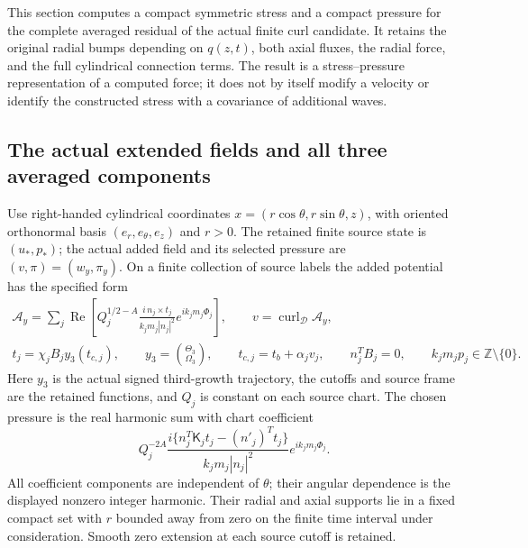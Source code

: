 This section computes a compact symmetric stress and a compact pressure
for the complete averaged residual of the actual finite curl candidate.
It retains the original radial bumps depending on $q(z,t)$, both axial
fluxes, the radial force, and the full cylindrical connection terms.
The result is a stress--pressure representation of a computed force;
it does not by itself modify a velocity or identify the constructed
stress with a covariance of additional waves.

\subsection{The actual extended fields and all three averaged components}

Use right-handed cylindrical coordinates
$x=(r\cos\theta,r\sin\theta,z)$, with oriented orthonormal basis
$(e_r,e_\theta,e_z)$ and $r>0$. The retained finite source state is
$(u_*,p_*)$; the actual added field and its selected pressure are
$(v,\pi)=(w_y,\pi_y)$. On a finite collection of source labels the
added potential has the specified form
\begin{equation}\label{mcstress:actual_potential}
\begin{gathered}
 \mathcal A_y=\sum_j\operatorname{Re}
   \left[Q_j^{1/2-A}
     \frac{i\,n_j\times t_j}{k_jm_j|n_j|^2}
                      e^{ik_jm_j\Phi_j}\right],\qquad
 v=\operatorname{curl}_{\mathscr D}\mathcal A_y,\\
 t_j=\chi_jB_jy_3(t_{c,j}),\qquad
 y_3=\binom{\Theta_3}{\Omega_3},\qquad
 t_{c,j}=t_b+\alpha_jv_j,\qquad
 n_j^TB_j=0,\qquad k_jm_jp_j\in\mathbb Z\setminus\{0\}.
\end{gathered}
\end{equation}
Here $y_3$ is the actual signed third-growth trajectory, the cutoffs
and source frame are the retained functions, and $Q_j$ is constant
on each source chart. The chosen pressure is the real harmonic sum
with chart coefficient
\[
 Q_j^{-2A}
 \frac{i\{n_j^T\mathsf K_jt_j-(n'_j)^Tt_j\}}
      {k_jm_j|n_j|^2}e^{ik_jm_j\Phi_j}.
\]
All coefficient components are independent of $\theta$; their angular
dependence is the displayed nonzero integer harmonic. Their radial
and axial supports lie in a fixed compact set with $r$ bounded away
from zero on the finite time interval under consideration. Smooth
zero extension at each source cutoff is retained.

